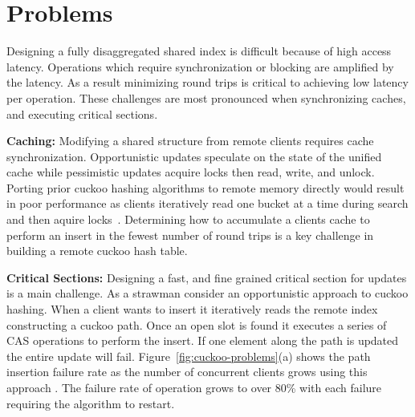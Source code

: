 \section{Problems}
\label{sec:problems}

Designing a fully disaggregated shared index is difficult
because of high access latency. Operations which require
synchronization or blocking are amplified by the latency. As
a result minimizing round trips is critical to achieving low
latency per operation. These challenges are most pronounced
when synchronizing caches, and executing critical sections.


\textbf{Caching:} Modifying a shared structure from remote
clients requires cache synchronization. Opportunistic
updates speculate on the state of the unified cache while
pessimistic updates acquire locks then read, write, and
unlock. Porting prior cuckoo hashing algorithms to remote
memory directly would result in poor performance as clients
iteratively read one bucket at a time during search and then
aquire locks~\cite{algorithmic-improvements, memc3, pilaf}.
Determining how to accumulate a clients cache to perform an
insert in the fewest number of round trips is a key
challenge in building a remote cuckoo hash table.



\textbf{Critical Sections:} Designing a fast, and fine
grained critical section for updates is a main challenge. As
a strawman consider an opportunistic approach to cuckoo
hashing. When a client wants to insert it iteratively reads
the remote index constructing a cuckoo path. Once an open
slot is found it executes a series of CAS operations to
perform the insert. If one element along the path is updated
the entire update will fail.
Figure~\ref{fig:cuckoo-problems}(a) shows the path insertion
failure rate as the number of concurrent clients grows using
this approach . The failure rate of operation grows to over 80\% with
each failure requiring the algorithm to restart.

